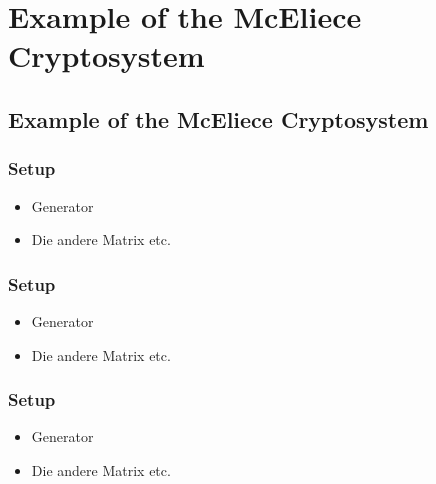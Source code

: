 \section[Example]{Example of the McEliece Cryptosystem}
	\subsection{Example of the McEliece Cryptosystem}
	
		\begin{frame}
			\frametitle{Setup}
			\begin{itemize}
				\item Generator
				\item Die andere Matrix etc.
			\end{itemize}
		\end{frame}

		\begin{frame}
			\frametitle{Setup}
			\begin{itemize}
				\item Generator
				\item Die andere Matrix etc.
			\end{itemize}
		\end{frame}
		
		\begin{frame}
			\frametitle{Setup}
			\begin{itemize}
				\item Generator
				\item Die andere Matrix etc.
			\end{itemize}
		\end{frame}